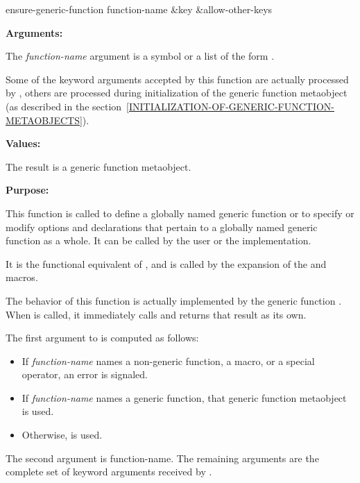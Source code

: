 \begin{defun}[Function]
ensure-generic-function function-name &key &allow-other-keys

\textbf{Arguments:}

The \emph{function-name} argument is a symbol or a list of the form .

Some of the keyword arguments accepted by this function are actually processed
by , others are processed during
initialization of the generic function metaobject (as described in the
section~\ref{INITIALIZATION-OF-GENERIC-FUNCTION-METAOBJECTS}).

\textbf{Values:}

The result is a generic function metaobject.

\textbf{Purpose:}

This function is called to define a globally named generic function or to
specify or modify options and declarations that pertain to a globally named
generic function as a whole. It can be called by the user or the implementation.

It is the functional equivalent of , and is called by the expansion of
the  and  macros.

The behavior of this function is actually implemented by the generic function
. When  is
called, it immediately calls  and
returns that result as its own.

The first argument to  is computed as follows:

\begin{itemize}
\item If \emph{function-name} names a non-generic function, a macro, or a
  special operator, an error is signaled.
\item If \emph{function-name} names a generic function, that generic function
  metaobject is used.
\item Otherwise,  is used.
\end{itemize}

The second argument is function-name. The remaining arguments are the complete
set of keyword arguments received by .
\end{defun}

